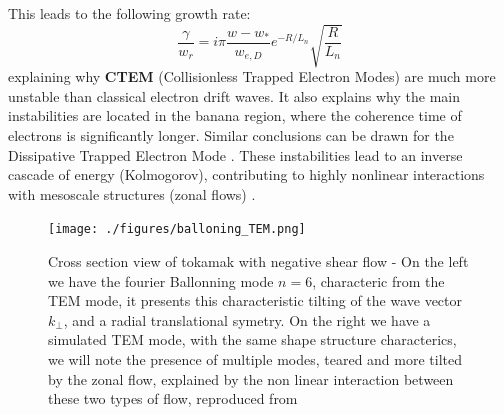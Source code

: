 \documentclass[11pt,a4paper,openany]{report}
\begin{document}
\begin{multicols}{2}
    This leads to the following growth rate:
    $$\frac{\gamma}{w_r} = i \pi \frac{w - w_*}{w_{e,D}} e^{-R/L_n} \sqrt{\frac{R}{L_n}}$$
    explaining why \textbf{CTEM} (Collisionless Trapped Electron Modes) are much more unstable than classical electron drift waves. It also explains why the main instabilities are located in the banana region, where the coherence time of electrons is significantly longer. Similar conclusions can be drawn for the Dissipative Trapped Electron Mode \cite{Trapped_Particle_Mode}. These instabilities lead to an inverse cascade of energy (Kolmogorov), contributing to highly nonlinear interactions with mesoscale structures (zonal flows) \cite{San_diego, Krutkin_thesis, DW_transport}.
\end{multicols}
\begin{figure}[H]
    \centering
    \texttt{[image: ./figures/balloning\_TEM.png]}
    \caption{Cross section view of tokamak with negative shear flow - On the left we have the fourier Ballonning mode $n = 6$, characteric from the TEM mode, it presents this characteristic tilting of the wave vector $k_{\perp}$, and a radial translational symetry. On the right we have a simulated TEM mode, with the same shape structure characterics, we will note the presence of multiple modes, teared and more tilted by the zonal flow, explained by the non linear interaction between these two types of flow, reproduced from \cite{TEM_simulation,Ballooning_transform} }
    \label{}
\end{figure}
\end{document}

